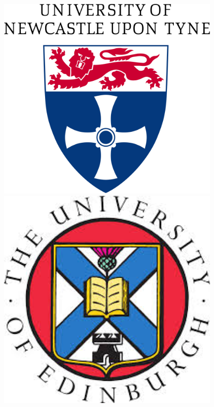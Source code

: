 \documentclass[a0,portrait]{a0poster}
\begin{document}
\begin{minipage}[b]{0.25\linewidth}
\includegraphics[width=11cm]{ncltitle2.jpg}\includegraphics[width=11cm]{edin.jpg}\\
\end{minipage}

\vspace{1cm} %

\end{document}
